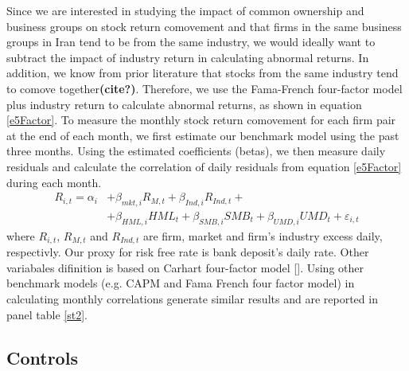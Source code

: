 Since we are interested in studying the impact of common ownership and business groups on stock return comovement and that firms in the same business groups in Iran tend to be from the same industry, we would ideally want to subtract the impact of industry return in calculating abnormal returns. In addition, we know from prior literature that stocks from the same industry tend to comove together\textbf{(cite?)}. Therefore, we use the Fama-French four-factor model plus industry return to calculate abnormal returns, as shown in equation \ref{e5Factor}. To measure the monthly stock return comovement for each firm pair at the end of each month, we first estimate our benchmark model using the past three months. Using the estimated coefficients (betas), we then measure daily residuals and calculate the correlation of daily residuals from equation \ref{e5Factor} during each month. 
	\begin{equation}
		\begin{split}
			R_{i,t} =\alpha _{i}&+\beta _{mkt,i}{\mathit {R}}_{M,t} + \beta_{Ind,i}{\mathit {R}}_{Ind,t} + \\
			&+\beta _{HML,i}{\mathit {HML}}_{t}+\beta _{SMB,i}{\mathit {SMB}}_{t}+\beta _{UMD,i}{\mathit {UMD}}_{t}+ \varepsilon_{i,t}
		\end{split}
		\label{e5Factor}
	\end{equation}
	where $ R_{i,t} $, $ R_{M,t} $ and $ R_{Ind,t} $ are firm, market and firm's industry excess daily, respectivly. Our proxy for risk free rate is bank deposit's daily rate. Other variabales difinition is based on Carhart four-factor model [\cite{Carhart4Factor}]. Using other benchmark models (e.g. CAPM and Fama French four factor model) in calculating monthly correlations generate similar results and are reported in panel  table \ref{st2}. 
	
	
	
	
%			



\FloatBarrier


\subsection{Controls}

